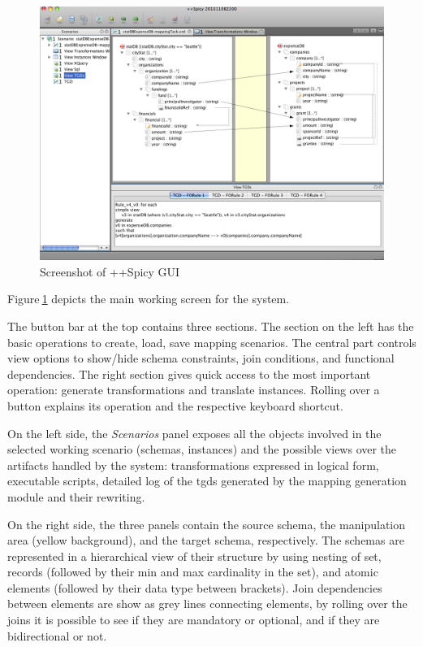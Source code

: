 \documentclass[12pt]{article}
\newcommand{\tld}{$~$}
\newcommand{\removespace}{\vspace*{-0.35cm}}
\newcommand{\removelargespace}{\vspace*{-0.7cm}}
\begin{document}
\begin{figure}[htb]
\removespace
\begin{center}
\includegraphics[width=\columnwidth]{images/gui.png}
\removespace
\caption{\small Screenshot of ++Spicy GUI} \label{fig:gui}
\end{center}
\removelargespace
\end{figure}

Figure\tld\ref{fig:gui} depicts the main working screen for the system. 

The button bar at the top contains three sections. The section on the left has the basic operations to create, load, save mapping scenarios. The central part controls view options to show/hide schema constraints, join conditions, and functional dependencies. The right section gives quick access to the most important operation: generate transformations and translate instances. Rolling over a button explains its operation and the respective keyboard shortcut.

On the left side, the {\it Scenarios} panel exposes all the objects involved in the selected working scenario (schemas, instances) and the possible views over the artifacts handled by the system: transformations expressed in logical form, executable scripts, detailed log of the tgds generated by the mapping generation module and their rewriting.

On the right side, the three panels contain the source schema, the manipulation area (yellow background), and the target schema, respectively. The schemas are represented in a hierarchical view of their structure by using nesting of set, records (followed by their min and max cardinality in the set), and atomic elements (followed by their data type between brackets). Join dependencies between elements are show as grey lines connecting elements, by rolling over the joins it is possible to see if they are mandatory or optional, and if they are bidirectional or not. 
\end{document}
